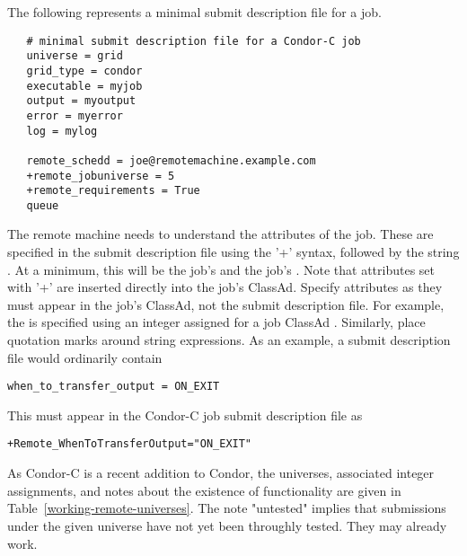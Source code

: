 The following represents a minimal submit description file for
a job.

\footnotesize
\begin{verbatim}
   # minimal submit description file for a Condor-C job
   universe = grid
   grid_type = condor
   executable = myjob
   output = myoutput
   error = myerror
   log = mylog

   remote_schedd = joe@remotemachine.example.com
   +remote_jobuniverse = 5
   +remote_requirements = True
   queue
\end{verbatim}
\normalsize

The remote machine needs to understand the attributes of the job.
These are specified in the submit description file using the '+'
syntax, followed by the string .
At a minimum, this will be the job's  and the job's
.
Note that attributes set with '+' are inserted directly into
the job's ClassAd.  
Specify attributes as they 
must appear in the job's ClassAd, not the submit description file. 
For example,
the  is specified using an integer assigned for
a job ClassAd .
Similarly, place quotation marks around string 
expressions.
As an example, a submit description file would ordinarily contain
\footnotesize
\begin{verbatim}
when_to_transfer_output = ON_EXIT
\end{verbatim}
\normalsize
This must appear in the Condor-C job submit description file as
\footnotesize
\begin{verbatim}
+Remote_WhenToTransferOutput="ON_EXIT"
\end{verbatim}
\normalsize

As Condor-C is a recent addition to Condor,
the universes, associated integer assignments,
and notes about the existence of functionality are given in 
Table~\ref{working-remote-universes}.
The note "untested" implies that
submissions under the given universe have not yet
been throughly tested.
They may already work.

